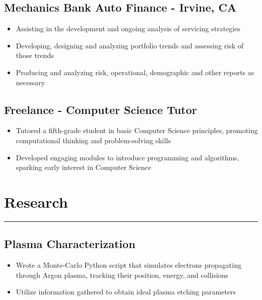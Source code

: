 \documentclass[11pt,a4paper]{article}
\newenvironment{myitemize}
{ \begin{itemize}[label={--}, leftmargin=*]
    \setlength{\itemsep}{0pt}
    \setlength{\parskip}{0pt}
    \setlength{\parsep}{0pt}     }
{ \end{itemize}                  }
\begin{document}
\subsection*{Mechanics Bank Auto Finance - Irvine, CA \hfill {} }

\begin{myitemize}
\item Assisting in the development and ongoing analysis of servicing strategies
\item Developing, designing and analyzing portfolio trends and assessing risk of those trends
\item Producing and analyzing risk, operational, demographic and other reports as necessary
\end{myitemize}


\subsection*{Freelance - Computer Science Tutor \hfill {} }

\begin{myitemize}
\item Tutored a fifth-grade student in basic Computer Science  principles, promoting computational thinking and problem-solving skills
\item Developed engaging modules to introduce programming and algorithms, sparking early interest in Computer Science
\end{myitemize}

\section*{Research}
\vspace{-3mm} %
\hrule
\vspace{3mm} %

\subsection*{Plasma Characterization \hfill {} }

\begin{myitemize}
\item Wrote a Monte-Carlo Python script that simulates electrons propagating through Argon
plasma, tracking their position, energy, and collisions
\item Utilize information gathered to obtain ideal plasma etching parameters
\end{myitemize}
\end{document}
